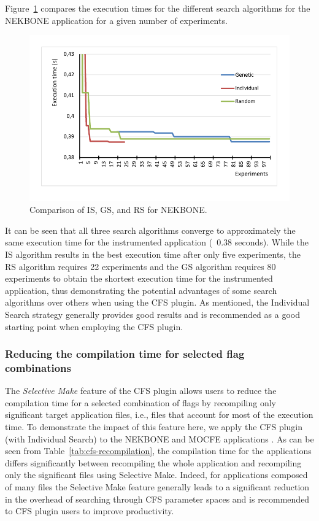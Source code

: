 Figure~\ref{fig:nek_comparisons} compares the execution times for the different search algorithms for the NEKBONE application for a given number of experiments.

\begin{figure}
        \centering
        \includegraphics[width=13cm]{../BPG/CFS/CFS-Nekbone-Comparison.pdf}
         \caption{Comparison of IS, GS, and RS for NEKBONE.}
     \label{fig:nek_comparisons}
\end{figure}

It can be seen that all three search algorithms converge to approximately the same execution time for the instrumented application (~0.38 seconds). While the IS algorithm results in the best execution time after only five experiments, the RS algorithm requires 22 experiments and the GS algorithm requires 80 experiments to obtain the shortest execution time for the instrumented application, thus demonstrating the potential advantages of some search algorithms over others when using the CFS plugin. As mentioned, the Individual Search strategy generally provides good results and is recommended as a good starting point when employing the CFS plugin.

\subsubsection{Reducing the compilation time for selected flag combinations} \label{sec:cfs-selective-make}

The \textit {Selective Make} feature of the CFS plugin allows users to reduce the compilation time for a selected combination of flags by recompiling only significant target application files, i.e., files that account for most of the execution time. To demonstrate the impact of this feature here, we apply the CFS plugin (with Individual Search) to the NEKBONE and MOCFE applications . As can be seen from Table~\ref{tab:cfs-recompilation}, the compilation time for the applications differs significantly between recompiling the whole application and recompiling only the significant files using Selective Make. Indeed, for applications composed of many files the Selective Make feature generally leads to a significant reduction in the overhead of searching through CFS parameter spaces and is recommended to CFS plugin users to improve productivity.

